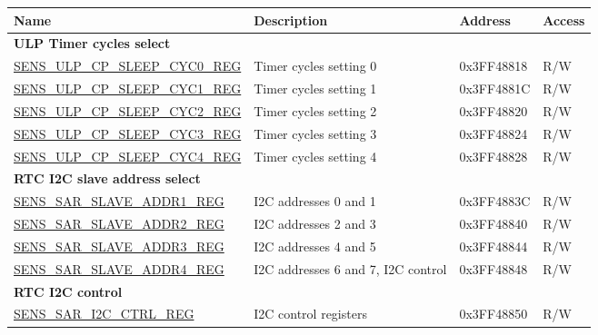 \begin{longtable}{ | p{6cm} | p{6.5cm} | p{2cm} | p{1cm} | }
    \hline\rowcolor{lightgray}
    Name & Description &  Address & Access \\ \hline
    \multicolumn{4}{|l|}{\textbf{ULP Timer cycles select}} \\ \hline
    \hyperref[regdesc:SENSULPCPSLEEPCYCnREG]{SENS\_ULP\_CP\_SLEEP\_CYC0\_REG} & Timer cycles setting 0 & 0x3FF48818 & R/W \\ \hline
    \hyperref[regdesc:SENSULPCPSLEEPCYCnREG]{SENS\_ULP\_CP\_SLEEP\_CYC1\_REG} & Timer cycles setting 1 & 0x3FF4881C & R/W \\ \hline
    \hyperref[regdesc:SENSULPCPSLEEPCYCnREG]{SENS\_ULP\_CP\_SLEEP\_CYC2\_REG} & Timer cycles setting 2 & 0x3FF48820 & R/W \\ \hline
    \hyperref[regdesc:SENSULPCPSLEEPCYCnREG]{SENS\_ULP\_CP\_SLEEP\_CYC3\_REG} & Timer cycles setting 3 & 0x3FF48824 & R/W \\ \hline
    \hyperref[regdesc:SENSULPCPSLEEPCYCnREG]{SENS\_ULP\_CP\_SLEEP\_CYC4\_REG} & Timer cycles setting 4 & 0x3FF48828 & R/W \\ \hline
    \multicolumn{4}{|l|}{\textbf{RTC I2C slave address select}} \\ \hline
    \hyperref[regdesc:SENSSARSLAVEADDR1REG]{SENS\_SAR\_SLAVE\_ADDR1\_REG} & I2C addresses 0 and 1 & 0x3FF4883C & R/W \\ \hline
    \hyperref[regdesc:SENSSARSLAVEADDR2REG]{SENS\_SAR\_SLAVE\_ADDR2\_REG} & I2C addresses 2 and 3 & 0x3FF48840 & R/W \\ \hline
    \hyperref[regdesc:SENSSARSLAVEADDR3REG]{SENS\_SAR\_SLAVE\_ADDR3\_REG} & I2C addresses 4 and 5 & 0x3FF48844 & R/W \\ \hline
    \hyperref[regdesc:SENSSARSLAVEADDR4REG]{SENS\_SAR\_SLAVE\_ADDR4\_REG} & I2C addresses 6 and 7, I2C control & 0x3FF48848 & R/W \\ \hline
    \multicolumn{4}{|l|}{\textbf{RTC I2C control}} \\ \hline
    \hyperref[regdesc:SENSSARI2CCTRLREG]{SENS\_SAR\_I2C\_CTRL\_REG} & I2C control registers & 0x3FF48850 & R/W \\ \hline
    \end{longtable}
    